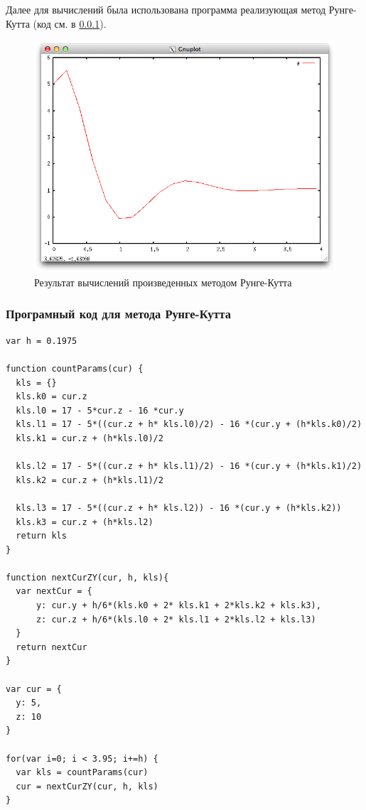 \documentclass{article}
\begin{document}
Далее для вычислений была использована программа реализующая метод Рунге-Кутта
(код см. в \ref{rungekuttaalg}).

\begin{figure}[h!]
  \includegraphics[width=13cm]{rungekutt.png}
  \caption{Результат вычислений произведенных методом Рунге-Кутта}
\end{figure}

\subsubsection{Програмный код для метода Рунге-Кутта}\label{rungekuttaalg}
\begin{lstlisting}
var h = 0.1975

function countParams(cur) {
  kls = {}
  kls.k0 = cur.z
  kls.l0 = 17 - 5*cur.z - 16 *cur.y
  kls.l1 = 17 - 5*((cur.z + h* kls.l0)/2) - 16 *(cur.y + (h*kls.k0)/2)
  kls.k1 = cur.z + (h*kls.l0)/2

  kls.l2 = 17 - 5*((cur.z + h* kls.l1)/2) - 16 *(cur.y + (h*kls.k1)/2)
  kls.k2 = cur.z + (h*kls.l1)/2

  kls.l3 = 17 - 5*((cur.z + h* kls.l2)) - 16 *(cur.y + (h*kls.k2))
  kls.k3 = cur.z + (h*kls.l2)
  return kls
} 

function nextCurZY(cur, h, kls){
  var nextCur = {
      y: cur.y + h/6*(kls.k0 + 2* kls.k1 + 2*kls.k2 + kls.k3),
      z: cur.z + h/6*(kls.l0 + 2* kls.l1 + 2*kls.l2 + kls.l3)
  }
  return nextCur
}

var cur = {
  y: 5,
  z: 10
}

for(var i=0; i < 3.95; i+=h) {
  var kls = countParams(cur)
  cur = nextCurZY(cur, h, kls)
}
\end{lstlisting}
\end{document}
